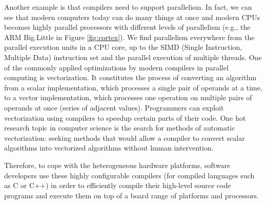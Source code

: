 Another example is that compilers need to support parallelism. In fact, we can see that modern computers today can do many things at once and modern CPUs becomes highly parallel processors with different levels of parallelism (e.g., the ARM Big.Little in Figure \ref{fig:cortex}). We find parallelism everywhere from the parallel execution units in a CPU core, up to the SIMD (Single Instruction, Multiple Data) instruction set and the parallel execution of multiple threads.  One of the commonly applied optimizations by modern compilers in parallel computing is vectorization. It constitutes the process of converting an algorithm from a scalar implementation, which processes a single pair of operands at a time, to a vector implementation, which processes one operation on multiple pairs of operands at once (series of adjacent values).
Programmers can exploit vectorization using compilers to speedup certain parts of their code. One hot research topic in computer science is the search for methods of automatic vectorization\cite{nuzman2006auto}: seeking methods that would allow a compiler to convert scalar algorithms into vectorized algorithms without human intervention.


Therefore, to cope with the heterogeneous hardware platforms, software developers use these highly configurable compilers (for compiled languages such as C or C++) in order to efficiently compile their high-level source code programs and execute them on top of a board range of platforms and processors. 


